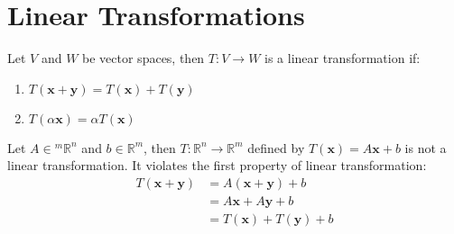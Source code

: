 \documentclass[11pt]{article}
\begin{document}
\section{Linear Transformations}
\begin{definition}
    Let $V$ and $W$ be vector spaces, then $T: V \rightarrow W$ is a linear transformation if:
    \begin{enumerate}
        \item $T(\textbf{x} + \textbf{y}) = T(\textbf{x}) + T(\textbf{y})$
        \item $T(\alpha \textbf{x}) = \alpha T(\textbf{x})$
    \end{enumerate}
\end{definition}
\begin{example}[$Ax + b$ is not LT]
    Let $A \in {^m\mathbb{R}^n}$ and $b \in \mathbb{R}^m$, then $T: \mathbb{R}^n \rightarrow \mathbb{R}^m$ defined by $T(\textbf{x}) = A\textbf{x} + b$ is not a linear transformation. It violates the first property of linear transformation:
    \begin{align*}
        T(\textbf{x} + \textbf{y}) &= A(\textbf{x} + \textbf{y}) + b \\
        &= A\textbf{x} + A\textbf{y} + b \\
        &= T(\textbf{x}) + T(\textbf{y}) + b
    \end{align*}
\end{example}
\end{document}
